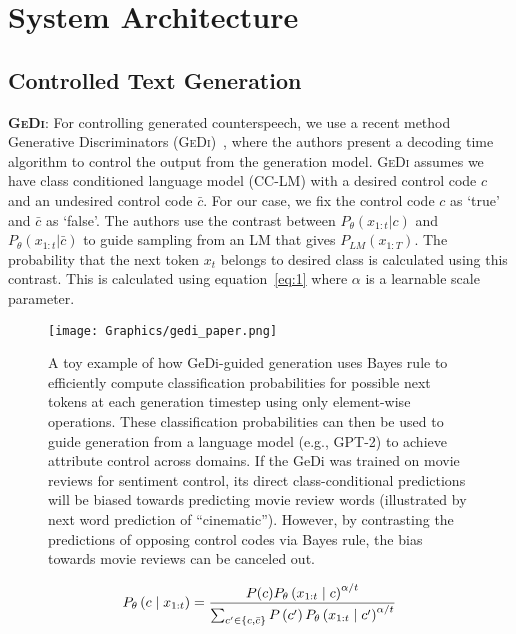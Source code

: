 \chapter{System Architecture}
\section{Controlled Text Generation}
\noindent\textbf{\textsc{GeDi}}: For controlling generated counterspeech,  we use a recent method Generative Discriminators (\textsc{GeDi})~\cite{krause2020gedi}, where the authors present a decoding time algorithm to control the output from the generation model. \textsc{GeDi} assumes we have class conditioned language model (CC-LM) with a desired control code $c$ and an undesired control code $\bar{c}$. For our case, we fix the control code $c$ as `true' and $\bar{c}$ as `false'. The authors use the contrast between $P_{\theta}(x_{1:t}|c)$ and $P_{\theta}(x_{1:t}|\bar{c})$ to guide sampling from an LM that gives $P_{LM}(x_{1:T})$. The probability that the next token $x_t$ belongs to desired class is calculated using this contrast. This is calculated using equation~\ref{eq:1} where $\alpha$ is a learnable scale parameter.

\begin{figure}
    \centering
    \texttt{[image: Graphics/gedi\_paper.png]}
    \caption{\scriptsize{A toy example of how GeDi-guided generation uses Bayes rule to efficiently compute classification
probabilities for possible next tokens at each generation timestep using only element-wise operations. These
classification probabilities can then be used to guide generation from a language model (e.g., GPT-2) to achieve
attribute control across domains. If the GeDi was trained on movie reviews for sentiment control, its direct
class-conditional predictions will be biased towards predicting movie review words (illustrated by next word
prediction of “cinematic”). However, by contrasting the predictions of opposing control codes via Bayes rule,
the bias towards movie reviews can be canceled out.}}
    \label{fig:gedi-figure}
\end{figure}

\begin{equation}
\scriptsize
    \label{eq:1}
    P_{\theta}\left(c \mid x_{1: t}\right)=\frac{P(c) P_{\theta}\left(x_{1: t} \mid c\right)^{\alpha / t}}{\sum_{c^{\prime} \in\{c, \bar{c}\}} P\left(c^{\prime}\right) P_{\theta}\left(x_{1: t} \mid c^{\prime}\right)^{\alpha / t}}
\end{equation}


